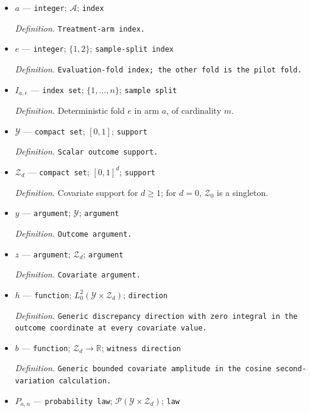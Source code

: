 \documentclass{article}
\begin{document}
\begin{itemize}
  \par\smallskip\noindent\emph{Definition.} \texttt{Treatment-\allowbreak{}arm index set.}
  \item \(a\) --- \texttt{integer}; \(\mathcal A\); \texttt{index}
  \par\smallskip\noindent\emph{Definition.} \texttt{Treatment-\allowbreak{}arm index.}
  \item \(e\) --- \texttt{integer}; \(\{1,2\}\); \texttt{sample-\allowbreak{}split index}
  \par\smallskip\noindent\emph{Definition.} \texttt{Evaluation-\allowbreak{}fold index;\allowbreak{} the other fold is the pilot fold.}
  \item \(I_{a,e}\) --- \texttt{index set}; \(\{1,\ldots,n\}\); \texttt{sample split}
  \par\smallskip\noindent\emph{Definition.} Deterministic fold \(e\) in arm \(a\), of cardinality \(m\).
  \item \(\mathcal Y\) --- \texttt{compact set}; \([0,1]\); \texttt{support}
  \par\smallskip\noindent\emph{Definition.} \texttt{Scalar outcome support.}
  \item \(\mathcal Z_d\) --- \texttt{compact set}; \([0,1]^d\); \texttt{support}
  \par\smallskip\noindent\emph{Definition.} Covariate support for \(d\ge1\); for \(d=0\), \(\mathcal Z_0\) is a singleton.
  \item \(y\) --- \texttt{argument}; \(\mathcal Y\); \texttt{argument}
  \par\smallskip\noindent\emph{Definition.} \texttt{Outcome argument.}
  \item \(z\) --- \texttt{argument}; \(\mathcal Z_d\); \texttt{argument}
  \par\smallskip\noindent\emph{Definition.} \texttt{Covariate argument.}
  \item \(h\) --- \texttt{function}; \(L_0^2(\mathcal Y\times\mathcal Z_d)\); \texttt{direction}
  \par\smallskip\noindent\emph{Definition.} \texttt{Generic discrepancy direction with zero integral in the outcome coordinate at every covariate value.}
  \item \(b\) --- \texttt{function}; \(\mathcal Z_d\to\mathbb R\); \texttt{witness direction}
  \par\smallskip\noindent\emph{Definition.} \texttt{Generic bounded covariate amplitude in the cosine second-\allowbreak{}variation calculation.}
  \item \(P_{a,n}\) --- \texttt{probability law}; \(\mathcal P(\mathcal Y\times\mathcal Z_d)\); \texttt{law}

\end{itemize}
\end{document}
